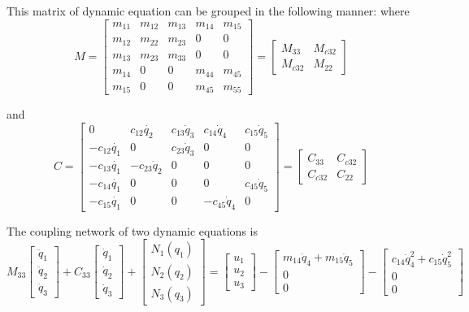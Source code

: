 {This matrix of dynamic equation can be grouped in the following manner:
where
\[
M=\left[\begin{array}{ccc|cc}
m_{11} & m_{12} & m_{13} & m_{14} & m_{15}\\
m_{12} & m_{22} & m_{23} & 0 & 0\\
m_{13} & m_{23} & m_{33} & 0 & 0\\ \hline
m_{14} & 0 & 0 & m_{44} & m_{45}\\
m_{15} & 0 & 0 & m_{45} & m_{55}\end{array}\right]
=\left[\begin{array}{cc}
M_{33} & M_{c32}\\
M_{c32} & M_{22}\end{array}\right]
\]

and
\[
C=
\left[\begin{array}{ccc|cc}
0 & c_{12}\dot{q_{2}} & c_{13}\dot{q}_{3} & c_{14}\dot{q}_{4} & c_{15}\dot{q}_{5}\\
-c_{12}\dot{q_{1}} & 0 & c_{23}\dot{q}_{3} & 0 & 0\\
-c_{13}\dot{q_{1}} & -c_{23}\dot{q}_{2} & 0 & 0 & 0\\ \hline
-c_{14}\dot{q_{1}} & 0 & 0 & 0 & c_{45}\dot{q}_{5}\\
-c_{15}\dot{q_{1}} & 0 & 0 & -c_{45}\dot{q}_{4} & 0\end{array}\right]
=\left[\begin{array}{cc}
C_{33} & C_{c32}\\
C_{c32} & C_{22}\end{array}\right]
\]

The coupling network of two dynamic equations is
\[
M_{33}\left[\begin{array}{c}
\ddot{q}_{1}\\
\ddot{q}_{2}\\
\ddot{q}_{3}\end{array}\right]+C_{33}\left[\begin{array}{c}
\dot{q}_{1}\\
\dot{q}_{2}\\
\dot{q}_{3}\end{array}\right]+\left[\begin{array}{c}
N_{1}(q_{1})\\
N_{2}(q_{2})\\
N_{3}(q_{3})\end{array}\right]=\left[\begin{array}{c}
u_{1}\\
u_{2}\\
u_{3}\end{array}\right]-\left[\begin{array}{c}
m_{14}\ddot{q}_{4}+m_{15}\ddot{q}_{5}\\
0\\
0\end{array}\right]-\left[\begin{array}{c}
c_{14}\dot{q}_{4}^{2}+c_{15}\dot{q}_{5}^{2}\\
0\\
0\end{array}\right]
\]

}
